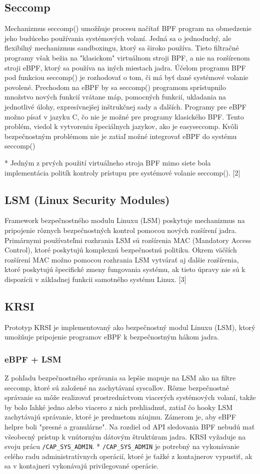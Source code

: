 \subsection{Seccomp}
Mechanizmus seccomp() umožňuje procesu načítať BPF program na obmedzenie jeho budúceho používania systémových volaní.
Jedná sa o jednoduchý, ale flexibilný mechanizmus sandboxingu, ktorý sa široko používa. 
Tieto filtračné programy však bežia na "klasickom" virtuálnom stroji BPF, a nie na rozšírenom stroji eBPF, ktorý sa používa na iných miestach jadra. 
Účelom programu BPF pod funkciou seccomp() je rozhodovať o tom, či má byť dané systémové volanie povolené.
Prechodom na eBPF by sa seccomp() programom sprístupnilo množstvo nových funkcií vrátane máp, pomocných funkcií, ukladania na jednotlivé úlohy, expresívnejšej inštrukčnej sady a ďalších. 
Programy pre eBPF možno písať v jazyku C, čo nie je možné pre programy klasického BPF. 
Tento problém, viedol k vytvoreniu špeciálnych jazykov, ako je easyseccomp. 
Kvôli bezpečnostným problémom nie je zatiaľ možné integrovať eBPF do systému seccomp()

* Jedným z prvých použití virtuálneho stroja BPF mimo siete bola implementácia politík kontroly prístupu pre systémové volanie seccomp(). [2]

\subsection{LSM (Linux Security Modules)}
Framework bezpečnostného modulu Linuxu (LSM) poskytuje mechanizmus na pripojenie rôznych bezpečnostných kontrol pomocou nových rozšírení jadra. Primárnymi používateľmi rozhrania LSM sú rozšírenia MAC (Mandatory Access Control), ktoré poskytujú komplexnú bezpečnostnú politiku. Okrem väčších rozšírení MAC možno pomocou rozhrania LSM vytvárať aj ďalšie rozšírenia, ktoré poskytujú špecifické zmeny fungovania systému, ak tieto úpravy nie sú k dispozícii v základnej funkcii samotného systému Linux. [3]

\subsection{KRSI}
Prototyp KRSI je implementovaný ako bezpečnostný modul Linuxu (LSM), ktorý umožňuje pripojenie programov eBPF k bezpečnostným hákom jadra.

\subsubsection*{eBPF + LSM}
Z pohľadu bezpečnostného správania sa lepšie mapuje na LSM ako na filtre seccomp, ktoré sú založené na zachytávaní syscallov. Rôzne bezpečnostné správanie sa môže realizovať prostredníctvom viacerých systémových volaní, takže by bolo ľahké jedno alebo viacero z nich prehliadnuť, zatiaľ čo hooky LSM zachytávajú správanie, ktoré je predmetom záujmu. Zámerom je, aby eBPF helpre boli "presné a granulárne". Na rozdiel od API sledovania BPF nebudú mať všeobecný prístup k vnútorným dátovým štruktúram jadra. 
KRSI vyžaduje na svoju prácu \texttt{/CAP\_SYS\_ADMIN}.
* \texttt{/CAP\_SYS\_ADMIN} je potrebný na vykonávanie celého radu administratívnych operácií, ktoré je ťažké z kontajnerov vypustiť, ak sa v kontajneri vykonávajú privilegované operácie.

